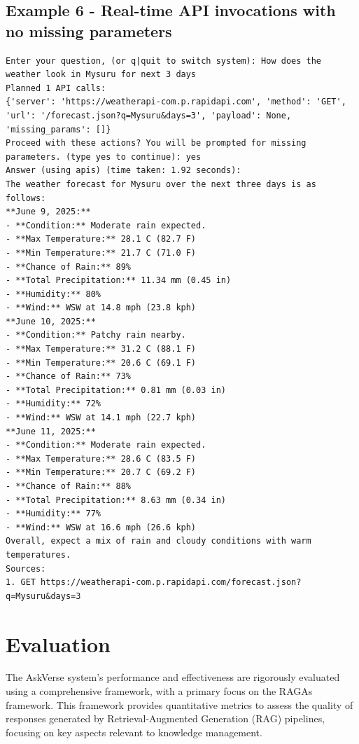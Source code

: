 \documentclass[default]{sn-jnl}%
\begin{document}
\subsection*{Example 6 - Real-time API invocations with no missing parameters}
\begin{lstlisting}[basicstyle=\ttfamily\small, frame=single, breaklines=true]
Enter your question, (or q|quit to switch system): How does the weather look in Mysuru for next 3 days
Planned 1 API calls:
{'server': 'https://weatherapi-com.p.rapidapi.com', 'method': 'GET', 'url': '/forecast.json?q=Mysuru&days=3', 'payload': None, 'missing_params': []}
Proceed with these actions? You will be prompted for missing parameters. (type yes to continue): yes
Answer (using apis) (time taken: 1.92 seconds):
The weather forecast for Mysuru over the next three days is as follows:
**June 9, 2025:**
- **Condition:** Moderate rain expected.
- **Max Temperature:** 28.1 C (82.7 F)
- **Min Temperature:** 21.7 C (71.0 F)
- **Chance of Rain:** 89%
- **Total Precipitation:** 11.34 mm (0.45 in)
- **Humidity:** 80%
- **Wind:** WSW at 14.8 mph (23.8 kph)
**June 10, 2025:**
- **Condition:** Patchy rain nearby.
- **Max Temperature:** 31.2 C (88.1 F)
- **Min Temperature:** 20.6 C (69.1 F)
- **Chance of Rain:** 73%
- **Total Precipitation:** 0.81 mm (0.03 in)
- **Humidity:** 72%
- **Wind:** WSW at 14.1 mph (22.7 kph)
**June 11, 2025:**
- **Condition:** Moderate rain expected.
- **Max Temperature:** 28.6 C (83.5 F)
- **Min Temperature:** 20.7 C (69.2 F)
- **Chance of Rain:** 88%
- **Total Precipitation:** 8.63 mm (0.34 in)
- **Humidity:** 77%
- **Wind:** WSW at 16.6 mph (26.6 kph)
Overall, expect a mix of rain and cloudy conditions with warm temperatures.
Sources:
1. GET https://weatherapi-com.p.rapidapi.com/forecast.json?q=Mysuru&days=3
\end{lstlisting}

\section*{Evaluation}
The AskVerse system's performance and effectiveness are rigorously evaluated using a comprehensive framework, with a primary focus on the RAGAs framework. This framework provides quantitative metrics to assess the quality of responses generated by Retrieval-Augmented Generation (RAG) pipelines, focusing on key aspects relevant to knowledge management.
\end{document}

